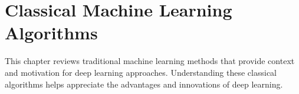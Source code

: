 
\chapter{Classical Machine Learning Algorithms}
\label{chap:classical-ml}

This chapter reviews traditional machine learning methods that provide context and motivation for deep learning approaches. Understanding these classical algorithms helps appreciate the advantages and innovations of deep learning.







